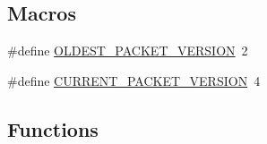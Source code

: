 \subsection*{Macros}
\begin{DoxyCompactItemize}
\item 
\#define \mbox{\hyperlink{group__wickr__protocol_gad269883d0b8b26c4fa52da595ef5ddf7}{O\+L\+D\+E\+S\+T\+\_\+\+P\+A\+C\+K\+E\+T\+\_\+\+V\+E\+R\+S\+I\+ON}}~2
\item 
\#define \mbox{\hyperlink{group__wickr__protocol_ga89ff9f93c5494db53d3ff27353989862}{C\+U\+R\+R\+E\+N\+T\+\_\+\+P\+A\+C\+K\+E\+T\+\_\+\+V\+E\+R\+S\+I\+ON}}~4
\end{DoxyCompactItemize}
\subsection*{Functions}
